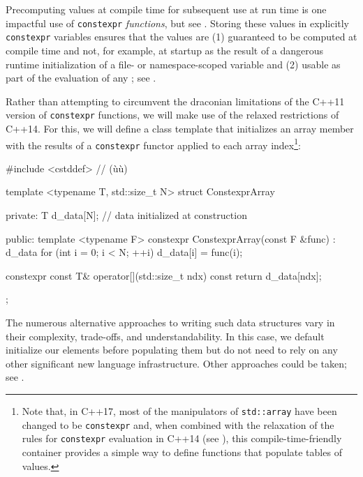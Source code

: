 Precomputing values at compile time for subsequent use at run time
is one impactful use of \lstinline!constexpr! \emph{functions}, but see . Storing these values in explicitly
\lstinline!constexpr! variables ensures that the values are (1) guaranteed
to be computed at compile time and not, for example, at startup as the
result of a dangerous runtime initialization of a file- or
namespace-scoped variable and (2) usable as part of the evaluation of
any ; see .

Rather than attempting to circumvent the draconian limitations of the
C++11 version of \lstinline!constexpr! functions, we will make use of the
relaxed restrictions of C++14. For this, we will define a class template
that initializes an array member with the results of a
\lstinline!constexpr! functor applied to each array
index{\cprotect\footnote{Note that, in C++17, most of the manipulators
of \lstinline!std::array! have been changed to be \lstinline!constexpr! and,
when combined with the relaxation of the rules for \lstinline!constexpr!
evaluation in C++14 (see ), this compile-time-friendly container provides a simple way to
  define functions that populate tables of values.}}:

\begin{emcppshiddenlisting}[emcppsbatch=e3,emcppsstandards={c++14}]
#include <cstddef>  // (ù{}ù)
\end{emcppshiddenlisting}
\begin{emcppslisting}[emcppsbatch=e3]
template <typename T, std::size_t N>
struct ConstexprArray
{
private:
    T d_data[N];  // data initialized at construction

public:
    template <typename F>
    constexpr ConstexprArray(const F &func)
    : d_data{}
    {
        for (int i = 0; i < N; ++i)
        {
            d_data[i] = func(i);
        }
    }

    constexpr const T& operator[](std::size_t ndx) const
    {
        return d_data[ndx];
    }
};
\end{emcppslisting}

\noindent The numerous alternative approaches to writing such data structures
vary in their complexity, trade-offs, and understandability. In this
case, we default initialize our elements before populating them but do
not need to rely on any other significant new language infrastructure.
Other approaches could be taken; see .

